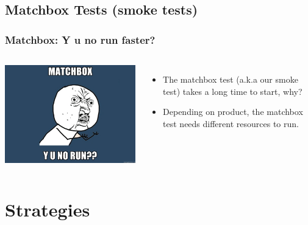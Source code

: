 \documentclass[xcolor=pdftex,dvipsnames,table]{beamer}
\begin{document}
\subsection{Matchbox Tests (smoke tests)}
\begin{frame}
  \frametitle{Matchbox: Y u no run faster?}
  \begin{columns}[cc]
  \column{0.7 in}
  \includegraphics[scale=0.33]{matchbox.jpg}
  \column{2.3 in}
  \begin{itemize}
    \item The matchbox test (a.k.a our smoke test) takes a long time to start, why?
    \item Depending on product, the matchbox test
      needs different resources to run.
  \end{itemize}
  \end{columns}
\end{frame}

\section{Strategies}
\end{document}
